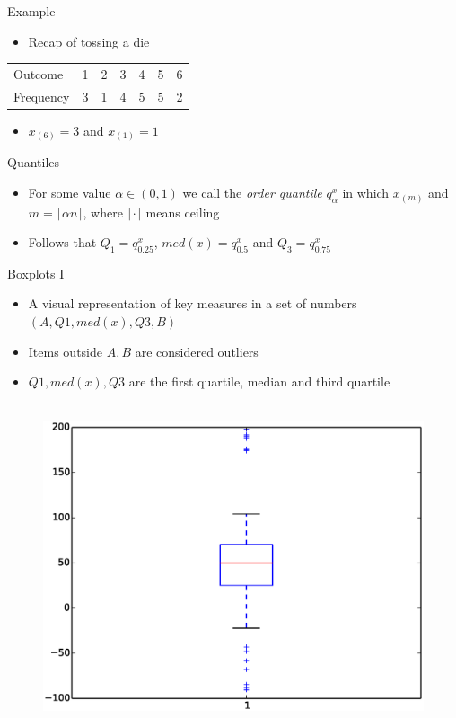 \documentclass{beamer}
\begin{document}
\begin{frame}{Example}  
\begin{itemize} 
 \item Recap of tossing a die 
\end{itemize}

\begin{table}
  \begin{tabular}{l | l l l l l l }
\hline 
  Outcome & 1 & 2 & 3 & 4 & 5 & 6 \\ 
  Frequency & 3 & 1 & 4 & 5 & 5 & 2 \\
\hline 
  \end{tabular} 
\end{table}
\begin{itemize} 
 \item $x_{(6)} = 3$ and $x_{(1)} = 1$
\end{itemize}
\end{frame}

\begin{frame}{Quantiles} 
\begin{itemize} 
 \item For some value $\alpha \in (0, 1)$ we call the \emph{order quantile} $q_\alpha^x$ in which $x_{(m)}$ and $m = \lceil \alpha n \rceil$, where $\lceil \cdot \rceil$ means ceiling
 \item Follows that $Q_1 = q_{0.25}^x$, $med(x) = q_{0.5}^x$ and $Q_3 = q_{0.75}^x$
\end{itemize}
\end{frame}

\begin{frame}{Boxplots I} 
\begin{itemize} 
 \item A visual representation of key measures in a set of numbers $(A, Q1, med(x), Q3, B)$ 
 \item Items outside $A, B$ are considered outliers 
 \item $Q1, med(x), Q3$ are the first quartile, median and third quartile 
\end{itemize}
  \begin{figure}[htp]
\mbox{
\includegraphics[width=0.5\linewidth]{BoxPlot.eps}
}
\end{figure} 
\end{frame}
\end{document}
